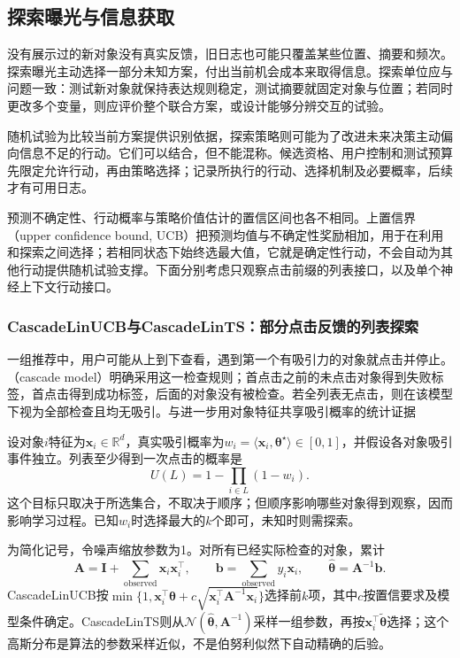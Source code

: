 \subsection{探索曝光与信息获取}
\label{sec:rs-exploration-exposure}

没有展示过的新对象没有真实反馈，旧日志也可能只覆盖某些位置、摘要和频次。探索曝光主动选择一部分未知方案，付出当前机会成本来取得信息。探索单位应与问题一致：测试新对象就保持表达规则稳定，测试摘要就固定对象与位置；若同时更改多个变量，则应评价整个联合方案，或设计能够分辨交互的试验。

随机试验为比较当前方案提供识别依据，探索策略则可能为了改进未来决策主动偏向信息不足的行动。它们可以结合，但不能混称。候选资格、用户控制和测试预算先限定允许行动，再由策略选择；记录所执行的行动、选择机制及必要概率，后续才有可用日志。

预测不确定性、行动概率与策略价值估计的置信区间也各不相同。上置信界（upper confidence bound, UCB）把预测均值与不确定性奖励相加，用于在利用和探索之间选择；若相同状态下始终选最大值，它就是确定性行动，不会自动为其他行动提供随机试验支撑。下面分别考虑只观察点击前缀的列表接口，以及单个神经上下文行动接口。

\subsubsection{CascadeLinUCB与CascadeLinTS：部分点击反馈的列表探索}
\label{sec:rs-cascade-linear}

一组推荐中，用户可能从上到下查看，遇到第一个有吸引力的对象就点击并停止。（cascade model）明确采用这一检查规则；首点击之前的未点击对象得到失败标签，首点击得到成功标签，后面的对象没有被检查。若全列表无点击，则在该模型下视为全部检查且均无吸引。与进一步用对象特征共享吸引概率的统计证据

设对象$i$特征为$\bm x_i\in\mathbb R^d$，真实吸引概率为$w_i=\langle\bm x_i,\bm\theta^\star\rangle\in[0,1]$，并假设各对象吸引事件独立。列表至少得到一次点击的概率是
\begin{equation}
 U(L)=1-\prod_{i\in L}(1-w_i).
 \label{eq:rs-cascade-utility}
\end{equation}
这个目标只取决于所选集合，不取决于顺序；但顺序影响哪些对象得到观察，因而影响学习过程。已知$w_i$时选择最大的$k$个即可，未知时则需探索。

为简化记号，令噪声缩放参数为1。对所有已经实际检查的对象，累计
\[
 \bm A=\bm I+\sum_{\mathrm{observed}}\bm x_i\bm x_i^\top,
 \qquad
 \bm b=\sum_{\mathrm{observed}}y_i\bm x_i,
 \qquad
 \widehat{\bm\theta}=\bm A^{-1}\bm b.
\]
CascadeLinUCB按$\min\{1,\bm x_i^\top\widehat{\bm\theta}
+c\sqrt{\bm x_i^\top\bm A^{-1}\bm x_i}\}$选择前$k$项，其中$c$按置信要求及模型条件确定。CascadeLinTS则从$\mathcal N(\widehat{\bm\theta},\bm A^{-1})$采样一组参数，再按$\bm x_i^\top\widetilde{\bm\theta}$选择；这个高斯分布是算法的参数采样近似，不是伯努利似然下自动精确的后验。

